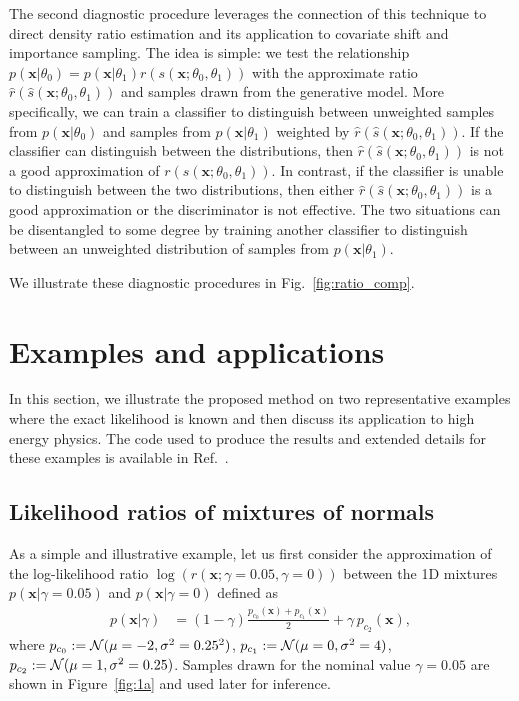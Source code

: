 \documentclass[12pt]{article}
\numberwithin{equation}{section}
\theoremstyle{plain}
\begin{document}
The second diagnostic procedure leverages the connection of this technique to direct density ratio estimation and its application to covariate shift and importance sampling. The idea is simple: we test the relationship $p(\mathbf{x}|\theta_0) = p(\mathbf{x}|\theta_1) {r}({s}(\mathbf{x}; \theta_0, \theta_1))$ with the approximate ratio $\hat{r}(\hat{s}(\mathbf{x}; \theta_0, \theta_1))$ and samples drawn from the generative model. More specifically, we can train a classifier to distinguish between unweighted samples from $p(\mathbf{x}|\theta_0)$ and samples from $p(\mathbf{x}|\theta_1)$ weighted by $\hat{r}(\hat{s}(\mathbf{x}; \theta_0, \theta_1))$.
If the classifier can distinguish between the distributions, then $\hat{r}(\hat{s}(\mathbf{x}; \theta_0, \theta_1))$ is not a good approximation of ${r}({s}(\mathbf{x}; \theta_0, \theta_1))$. In contrast, if the classifier is unable to distinguish between the two distributions, then either $\hat{r}(\hat{s}(\mathbf{x}; \theta_0, \theta_1))$ is a good approximation or the discriminator is not effective. The two situations can be disentangled to some degree by training another classifier to distinguish between an unweighted distribution of samples from $p(\mathbf{x}|\theta_1)$.

We illustrate these diagnostic procedures in Fig.~\ref{fig:ratio_comp}.

\section{Examples and applications}
\label{sec:examples}

In this section, we illustrate the proposed method on two representative
examples where the exact likelihood is known and then discuss its application to high energy physics. The code used to produce the results and extended details for these examples is available in Ref.~\citep{carl}.%

\subsection{Likelihood ratios of mixtures of normals}

As a simple and illustrative example, let us first consider the approximation of
the log-likelihood ratio $\log \left( r(\mathbf{x};\gamma=0.05,\gamma=0) \right)$ between the 1D mixtures
$p(\mathbf{x}|\gamma=0.05)$ and $p(\mathbf{x}|\gamma=0)$ defined as
\begin{align}
p(\mathbf{x}|\gamma) &= (1-\gamma)\frac{p_{c_0}(\mathbf{x}) +  p_{c_1}(\mathbf{x})}{2}   + \gamma \, p_{c_2}(\mathbf{x}),
\end{align}
where $p_{c_0} := {\cal N}(\mu=-2, \sigma^2=0.25^2)$, $p_{c_1} := {\cal N}(\mu=0, \sigma^2=4)$,
$p_{c_2} := {\cal N}(\mu=1, \sigma^2=0.25)$. Samples drawn for the nominal value $\gamma=0.05$ are shown in
Figure~\ref{fig:1a} and used later for inference.
\end{document}
